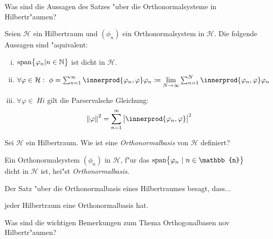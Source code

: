 \documentclass[9pt]{article}
\newcommand{\Hi}{\mathcal{H}}
\DeclarePairedDelimiter{\innerprod}\langle\rangle
\newenvironment{field}{}{\newpage}
\newif\ifnote
\newenvironment{note}{\notetrue}{\notefalse}
\newcommand{\localtag}{}
\newcommand{\globaltag}{}
\newcommand{\uuid}{}
\newcommand{\tags}[1]{
    \ifnote 
        \renewcommand{\localtag}{#1}
    \else
        \renewcommand{\globaltag}{#1}
    \fi 
    }
\newcommand{\xplain}[1]{\renewcommand{\uuid}{#1}}
\begin{document}
	\begin{note}
		\xplain{UUID}
		\tags{satz, ONS, 5.2.13}
		
		\begin{field}  %
			Was sind die Aussagen des Satzes "uber die Orthonormalsysteme in Hilbertr"aumen?
		\end{field}
		
		\begin{field}  %
			Seien $\Hi$ ein Hilbertraum und $(\phi_n)$ ein Orthonormalsystem in $\Hi$. Die folgende Aussagen sind "aquivalent:
			\begin{enumerate}[i)]
				\item $\text{span}\qty{\varphi_n | n\in \mathbb{N}}$ ist dicht in $\Hi$.
				\item $\forall \varphi \in \Hi: \ \phi = \sum_{n=1}^\infty \innerprod{\varphi_n, \varphi}\varphi_n \coloneqq \lim\limits_{N\rightarrow \infty}\sum_{n=1}^N \innerprod{\varphi_n, \varphi}\varphi_n$
				\item $\forall \varphi \in \ Hi$ gilt die Parservalsche Gleichung:
					\begin{equation*}
						\norm{\varphi}^2 = \sum_{n=1}^\infty\abs{\innerprod{\varphi_n, \varphi}}^2
					\end{equation*}
			\end{enumerate} 
		\end{field}
		
		\begin{field}  %
			Sei $\Hi$ ein Hilbertraum. Wie ist eine \textit{Orthonormalbasis} von $\Hi$ definiert? 
		\end{field}
			
		\begin{field}  %
			Ein Orthonormalsystem $(\phi_n)$ in $\Hi$, f"ur das $\text{span}\qty{\varphi_n \ | \ n\in \mathbb{n}}$ dicht in $\Hi$ ist, hei"st \textit{Orthonormalbasis}. 
		\end{field}
			
		\begin{field}  %
			Der Satz "uber die Orthonormalbasis eines Hilbertraumes besagt, dass...
		\end{field}
		
		\begin{field}  %
			jeder Hilbertraum eine Orthonormalbasis hat. 
		\end{field}
			
		\begin{field}  %
			Was sind die wichtigen Bemerkungen zum Thema Orthogonalbasen nov Hilbertr"aumen?
		\end{field}
		

\end{note}
\end{document}
